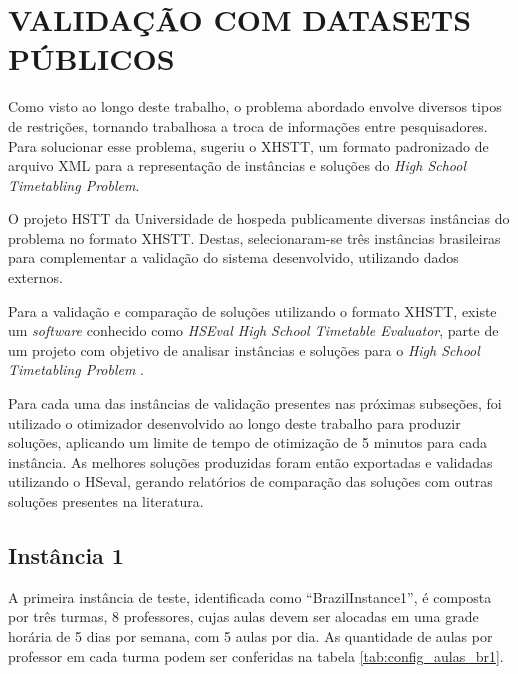 \section{VALIDAÇÃO COM DATASETS PÚBLICOS}
\label{sec:validacao_datasets}

Como visto ao longo deste trabalho, o problema abordado envolve diversos tipos de restrições, tornando trabalhosa a troca de informações entre pesquisadores. Para solucionar esse problema,  sugeriu o XHSTT, um formato padronizado de arquivo XML para a representação de instâncias e soluções do \textit{High School Timetabling Problem}.

O projeto HSTT da Universidade de  hospeda publicamente diversas instâncias do problema no formato XHSTT. Destas, selecionaram-se três instâncias brasileiras para complementar a validação do sistema desenvolvido, utilizando dados externos.

Para a validação e comparação de soluções utilizando o formato XHSTT, existe um \textit{software} conhecido como \textit{HSEval High School Timetable Evaluator}, parte de um projeto com objetivo de analisar instâncias e soluções para o \textit{High School Timetabling Problem} \cite{HSEval}.

Para cada uma das instâncias de validação presentes nas próximas subseções, foi utilizado o otimizador desenvolvido ao longo deste trabalho para produzir soluções, aplicando um limite de tempo de otimização de 5 minutos para cada instância. As melhores soluções produzidas foram então exportadas e validadas utilizando o HSeval, gerando relatórios de comparação das soluções com outras soluções presentes na literatura.

\subsection{Instância 1}

A primeira instância de teste, identificada como ``BrazilInstance1'', é composta por três turmas, 8 professores, cujas aulas devem ser alocadas em uma grade horária de 5 dias por semana, com 5 aulas por dia. As quantidade de aulas por professor em cada turma podem ser conferidas na tabela \ref{tab:config_aulas_br1}.



